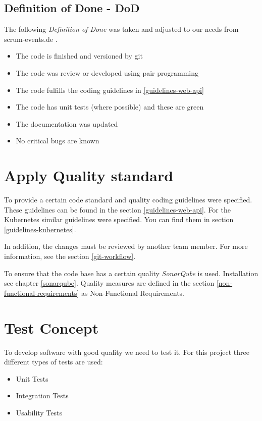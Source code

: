 \subsection{Definition of Done - DoD}
The following \textit{Definition of Done} was taken and adjusted to our needs from scrum-events.de \cite{www.scrum-events.de_dod}.
\begin{itemize}
  \item The code is finished and versioned by git
  \item The code was review or developed using pair programming
  \item The code fulfills the coding guidelines in \ref{guidelines-web-api}
  \item The code has unit tests (where possible) and these are green
  \item The documentation was updated
  \item No critical bugs are known
\end{itemize}

\section{Apply Quality standard}
To provide a certain code standard and quality coding guidelines were specified.
These guidelines can be found in the section \ref{guidelines-web-api}.
For the Kubernetes similar guidelines were specified.
You can find them in section \ref{guidelines-kubernetes}.

In addition, the changes must be reviewed by another team member.
For more information, see the section \ref{git-workflow}.

To ensure that the code base has a certain quality \textit{SonarQube} is used.
Installation see chapter \ref{sonarqube}.
Quality measures are defined in the section \ref{non-functional-requirements} as Non-Functional Requirements.


\section{Test Concept}
To develop software with good quality we need to test it.
For this project three different types of tests are used:

\begin{itemize}
  \item Unit Tests
  \item Integration Tests
  \item Usability Tests
\end{itemize}

